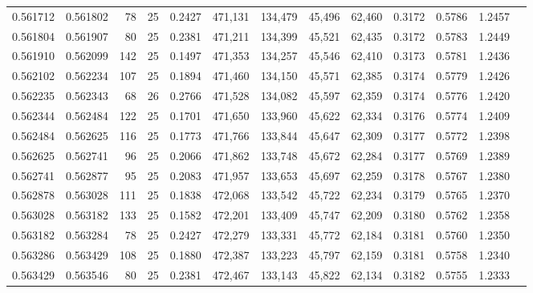 \begin{tabular}{rrrrrrrrrrrrr}
0.561712 & 0.561802 &    78 &  25 &                                     0.2427 & 471,131 & 134,479 &  45,496 &  62,460 & 0.3172 & 0.5786 & 1.2457 \\
0.561804 & 0.561907 &    80 &  25 &                                     0.2381 & 471,211 & 134,399 &  45,521 &  62,435 & 0.3172 & 0.5783 & 1.2449 \\
0.561910 & 0.562099 &   142 &  25 &                                     0.1497 & 471,353 & 134,257 &  45,546 &  62,410 & 0.3173 & 0.5781 & 1.2436 \\
0.562102 & 0.562234 &   107 &  25 &                                     0.1894 & 471,460 & 134,150 &  45,571 &  62,385 & 0.3174 & 0.5779 & 1.2426 \\
0.562235 & 0.562343 &    68 &  26 &                                     0.2766 & 471,528 & 134,082 &  45,597 &  62,359 & 0.3174 & 0.5776 & 1.2420 \\
0.562344 & 0.562484 &   122 &  25 &                                     0.1701 & 471,650 & 133,960 &  45,622 &  62,334 & 0.3176 & 0.5774 & 1.2409 \\
0.562484 & 0.562625 &   116 &  25 &                                     0.1773 & 471,766 & 133,844 &  45,647 &  62,309 & 0.3177 & 0.5772 & 1.2398 \\
0.562625 & 0.562741 &    96 &  25 &                                     0.2066 & 471,862 & 133,748 &  45,672 &  62,284 & 0.3177 & 0.5769 & 1.2389 \\
0.562741 & 0.562877 &    95 &  25 &                                     0.2083 & 471,957 & 133,653 &  45,697 &  62,259 & 0.3178 & 0.5767 & 1.2380 \\
0.562878 & 0.563028 &   111 &  25 &                                     0.1838 & 472,068 & 133,542 &  45,722 &  62,234 & 0.3179 & 0.5765 & 1.2370 \\
0.563028 & 0.563182 &   133 &  25 &                                     0.1582 & 472,201 & 133,409 &  45,747 &  62,209 & 0.3180 & 0.5762 & 1.2358 \\
0.563182 & 0.563284 &    78 &  25 &                                     0.2427 & 472,279 & 133,331 &  45,772 &  62,184 & 0.3181 & 0.5760 & 1.2350 \\
0.563286 & 0.563429 &   108 &  25 &                                     0.1880 & 472,387 & 133,223 &  45,797 &  62,159 & 0.3181 & 0.5758 & 1.2340 \\
0.563429 & 0.563546 &    80 &  25 &                                     0.2381 & 472,467 & 133,143 &  45,822 &  62,134 & 0.3182 & 0.5755 & 1.2333 \\

\end{tabular}
